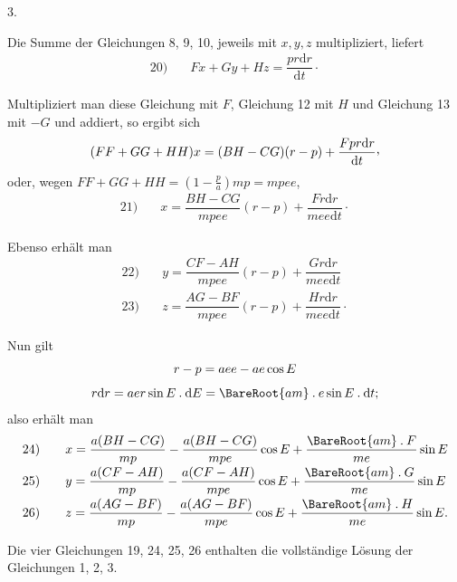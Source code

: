 \par{}\bigskip
{}
\begin{center}3.\end{center}
\noindent\hspace*{\parindent}Die Summe der Gleichungen 8, 9, 10, jeweils mit \(x,y,z\) multipliziert, liefert
\[
\begin{array}{rl}20)\quad&Fx+Gy+Hz=\dfrac{pr\mathrm{d}r}{\mathrm{d}t}\mathpunct{\cdot}\end{array}
\]
\par Multipliziert man diese Gleichung mit \(F\), Gleichung 12 mit \(H\) und Gleichung 13 mit \(-G\) und addiert, so ergibt sich
\[
(FF+GG+HH)x=(BH-CG)(r-p)+\frac{Fpr\mathrm{d}r}{\mathrm{d}t}\mathpunct{\raisebox{.45ex}{,}}
\]
oder, wegen \(FF+GG+HH=\left(1-\frac{p}{a}\right)mp=mpee\),
\[
\begin{array}{rl}21)\quad&x=\dfrac{BH-CG}{mpee}(r-p)+\dfrac{Fr\mathrm{d}r}{mee\mathrm{d}t}\mathpunct{\cdot}\end{array}
\]
\par Ebenso erhält man
\[
\begin{array}{rl}
22)\quad&y=\dfrac{CF-AH}{mpee}(r-p)+\dfrac{Gr\mathrm{d}r}{mee\mathrm{d}t}\\[6pt]
23)\quad&z=\dfrac{AG-BF}{mpee}(r-p)+\dfrac{Hr\mathrm{d}r}{mee\mathrm{d}t}\mathpunct{\cdot}
\end{array}
\]
\par Nun gilt
\[
\begin{gathered}
r-p=aee-ae\cos E\\[4pt]
r\mathrm{d}r=aer\sin E\mathbin{.}\mathrm{d}E=\BareRoot{am}\mathbin{.}e\sin E\mathbin{.}\mathrm{d}t;
\end{gathered}
\]
also erhält man
\[
\begin{array}{rl}
24)\quad&x=\dfrac{a(BH-CG)}{mp}-\dfrac{a(BH-CG)}{mpe}\cos E+\dfrac{\BareRoot{am}\mathbin{.}F}{me}\sin E\\[7pt]
25)\quad&y=\dfrac{a(CF-AH)}{mp}-\dfrac{a(CF-AH)}{mpe}\cos E+\dfrac{\BareRoot{am}\mathbin{.}G}{me}\sin E\\[7pt]
26)\quad&z=\dfrac{a(AG-BF)}{mp}-\dfrac{a(AG-BF)}{mpe}\cos E+\dfrac{\BareRoot{am}\mathbin{.}H}{me}\sin E.
\end{array}
\]
\par Die vier Gleichungen 19, 24, 25, 26 enthalten die vollständige Lösung der Gleichungen 1, 2, 3.
